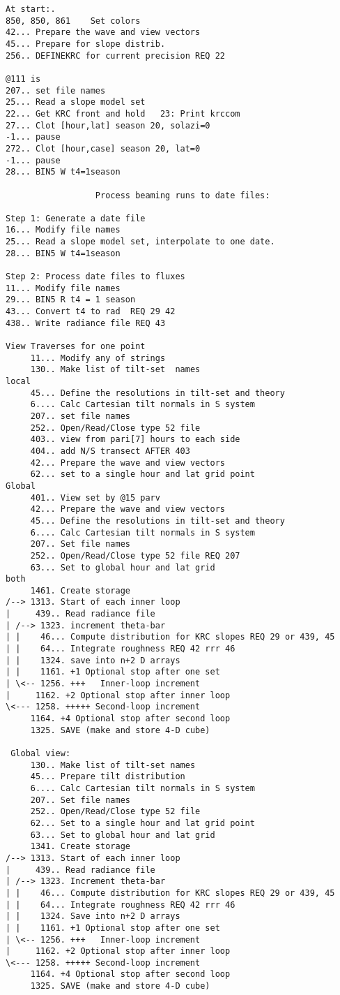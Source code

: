 \documentclass{article}
\begin{document}
\begin{verbatim}
At start:.
850, 850, 861    Set colors
42... Prepare the wave and view vectors
45... Prepare for slope distrib.
256.. DEFINEKRC for current precision REQ 22 

@111 is
207.. set file names
25... Read a slope model set
22... Get KRC front and hold   23: Print krccom
27... Clot [hour,lat] season 20, solazi=0
-1... pause
272.. Clot [hour,case] season 20, lat=0
-1... pause
28... BIN5 W t4=1season

                  Process beaming runs to date files:

Step 1: Generate a date file
16... Modify file names
25... Read a slope model set, interpolate to one date.
28... BIN5 W t4=1season

Step 2: Process date files to fluxes
11... Modify file names
29... BIN5 R t4 = 1 season
43... Convert t4 to rad  REQ 29 42
438.. Write radiance file REQ 43

View Traverses for one point
     11... Modify any of strings
     130.. Make list of tilt-set  names
local
     45... Define the resolutions in tilt-set and theory
     6.... Calc Cartesian tilt normals in S system
     207.. set file names
     252.. Open/Read/Close type 52 file
     403.. view from pari[7] hours to each side
     404.. add N/S transect AFTER 403
     42... Prepare the wave and view vectors
     62... set to a single hour and lat grid point
Global
     401.. View set by @15 parv
     42... Prepare the wave and view vectors
     45... Define the resolutions in tilt-set and theory 
     6.... Calc Cartesian tilt normals in S system
     207.. Set file names
     252.. Open/Read/Close type 52 file REQ 207
     63... Set to global hour and lat grid
both
     1461. Create storage
/--> 1313. Start of each inner loop
|     439.. Read radiance file
| /--> 1323. increment theta-bar
| |    46... Compute distribution for KRC slopes REQ 29 or 439, 45
| |    64... Integrate roughness REQ 42 rrr 46 
| |    1324. save into n+2 D arrays
| |    1161. +1 Optional stop after one set
| \<-- 1256. +++   Inner-loop increment
|     1162. +2 Optional stop after inner loop
\<--- 1258. +++++ Second-loop increment
     1164. +4 Optional stop after second loop
     1325. SAVE (make and store 4-D cube)

 Global view:
     130.. Make list of tilt-set names
     45... Prepare tilt distribution
     6.... Calc Cartesian tilt normals in S system
     207.. Set file names
     252.. Open/Read/Close type 52 file
     62... Set to a single hour and lat grid point
     63... Set to global hour and lat grid
     1341. Create storage
/--> 1313. Start of each inner loop
|     439.. Read radiance file
| /--> 1323. Increment theta-bar
| |    46... Compute distribution for KRC slopes REQ 29 or 439, 45
| |    64... Integrate roughness REQ 42 rrr 46 
| |    1324. Save into n+2 D arrays
| |    1161. +1 Optional stop after one set
| \<-- 1256. +++   Inner-loop increment
|     1162. +2 Optional stop after inner loop
\<--- 1258. +++++ Second-loop increment
     1164. +4 Optional stop after second loop
     1325. SAVE (make and store 4-D cube)
\end{verbatim}
\vspace{-3.mm} 
\end{document}
